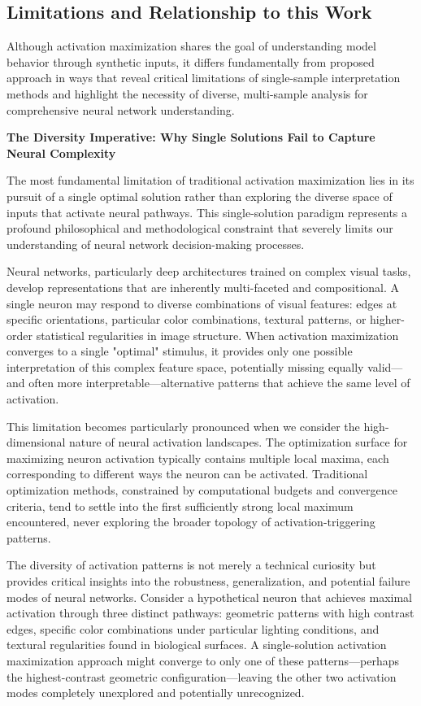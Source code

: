 \subsection{Limitations and Relationship to this Work}

Although activation maximization shares the goal of understanding model behavior through synthetic inputs, it differs fundamentally from proposed approach in ways that reveal critical limitations of single-sample interpretation methods and highlight the necessity of diverse, multi-sample analysis for comprehensive neural network understanding.

\textbf{The Diversity Imperative: Why Single Solutions Fail to Capture Neural Complexity}

The most fundamental limitation of traditional activation maximization lies in its pursuit of a single optimal solution rather than exploring the diverse space of inputs that activate neural pathways. This single-solution paradigm represents a profound philosophical and methodological constraint that severely limits our understanding of neural network decision-making processes.

Neural networks, particularly deep architectures trained on complex visual tasks, develop representations that are inherently multi-faceted and compositional. A single neuron may respond to diverse combinations of visual features: edges at specific orientations, particular color combinations, textural patterns, or higher-order statistical regularities in image structure. When activation maximization converges to a single "optimal" stimulus, it provides only one possible interpretation of this complex feature space, potentially missing equally valid—and often more interpretable—alternative patterns that achieve the same level of activation.

This limitation becomes particularly pronounced when we consider the high-dimensional nature of neural activation landscapes. The optimization surface for maximizing neuron activation typically contains multiple local maxima, each corresponding to different ways the neuron can be activated. Traditional optimization methods, constrained by computational budgets and convergence criteria, tend to settle into the first sufficiently strong local maximum encountered, never exploring the broader topology of activation-triggering patterns.

The diversity of activation patterns is not merely a technical curiosity but provides critical insights into the robustness, generalization, and potential failure modes of neural networks. Consider a hypothetical neuron that achieves maximal activation through three distinct pathways: geometric patterns with high contrast edges, specific color combinations under particular lighting conditions, and textural regularities found in biological surfaces. A single-solution activation maximization approach might converge to only one of these patterns—perhaps the highest-contrast geometric configuration—leaving the other two activation modes completely unexplored and potentially unrecognized.


